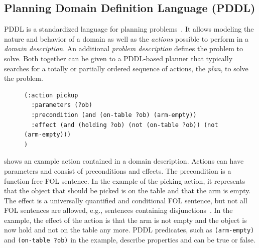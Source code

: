 \subsection{Planning Domain Definition Language (PDDL)}
PDDL is a standardized language for planning
problems~\cite{PDDL}. It allows modeling the nature and behavior of a
domain as well as the \emph{actions} possible to perform in a
\emph{domain description}. An additional \emph{problem description}
defines the problem to solve. Both together can be given to a PDDL-based
planner that typically searches for a totally or partially ordered
sequence of actions, the \emph{plan}, to solve the problem.
\begin{figure}
\begin{lstlisting}[showlines,style=ReallySmallCLIPS, caption={PDDL
      action to pick up an object from a table},
  label=lsf:pddl-action,
  emph={skill, args, state, target, res},
  emphstyle=\bfseries\color{green!80!black},
  emph={[2]\?skill, \$\?args, wait-for-lock, \?target, use,
  WAIT-FOR-LOCK, SKILL-EXECUTION, running},
  emphstyle={[2]\bfseries\color{blue!80!black}},
  morekeywords={action, parameters, precondition, effect}]
(:action pickup
  :parameters (?ob)
  :precondition (and (on-table ?ob) (arm-empty))
  :effect (and (holding ?ob) (not (on-table ?ob)) (not (arm-empty)))
)
\end{lstlisting}
\end{figure}
 shows an example action contained in a domain
description.  Actions can have parameters and consist of preconditions
and effects. The precondition is a function free FOL sentence. In the
example of the picking action, it represents that the object that
should be picked is on the table and that the arm is empty. The effect
is a universally quantified and conditional FOL sentence, but not all FOL
sentences are allowed, e.g., sentences containing disjunctions~\cite{PDDL}. In the
example, the effect of the action is that the arm is not empty and the
object is now hold and not on the table any more. PDDL predicates,
such as \texttt{(arm-empty)} and \texttt{(on-table ?ob)} in the example,
describe properties and can be true or false.

